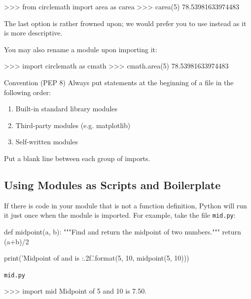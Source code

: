 \documentclass[11pt]{cselabheader}
\begin{document}
{\begin{pyconcode}
>>> from circlemath import area as carea
>>> carea(5)
78.53981633974483
\end{pyconcode}

The last option is rather frowned upon; we would prefer you to use
 instead as it is more descriptive.

You may also rename a module upon importing it:

\begin{pyconcode}
>>> import circlemath as cmath
>>> cmath.area(5)
78.53981633974483
\end{pyconcode}


\begin{infobox}{Convention (PEP 8)}
  Always put  statements at the beginning of a file in the
  following order:
  \begin{enumerate}
    \item Built-in standard library modules
    \item Third-party modules (e.g. matplotlib)
    \item Self-written modules
  \end{enumerate}
  Put a blank line between each group of imports.
\end{infobox}

\subsection{Using Modules as Scripts and Boilerplate}

If there is code in your module that is not a function definition, Python will
run it just once when the module is imported. For example, take the file
\texttt{mid.py}:

\begin{listing}[H]
  \vspace{-0.5em}
\begin{python3code}
def midpoint(a, b):
    """Find and return the midpoint of two numbers."""
    return (a+b)/2

print('Midpoint of {} and {} is {:.2f}.'.format(5, 10, midpoint(5, 10)))
\end{python3code}
  \vspace{-1em}
  \caption{\texttt{mid.py}}
  \vspace{-0.5em}
\end{listing}

\begin{pyconcode}
>>> import mid
Midpoint of 5 and 10 is 7.50.
\end{pyconcode}

}
\end{document}
